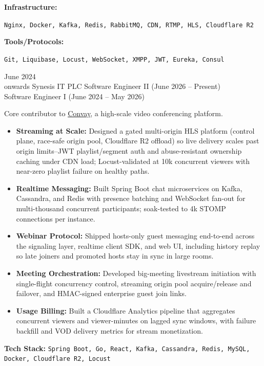 \documentclass[9pt]{developercv}
\begin{document}
\begin{minipage}[t]{0.2\textwidth}
    \textbf{Infrastructure:}
\end{minipage}
\hfill
\begin{minipage}[t]{0.8\textwidth}
  {\large \texttt{Nginx, Docker, Kafka, Redis, RabbitMQ, CDN, RTMP, HLS, Cloudflare R2}}
\end{minipage}

\begin{minipage}[t]{0.2\textwidth}
    \textbf{Tools/Protocols:}
\end{minipage}
\hfill
\begin{minipage}[t]{0.8\textwidth}
  {\large \texttt{Git, Liquibase, Locust, WebSocket, XMPP, JWT, Eureka, Consul}}
\end{minipage}

\begin{entrylist}
    \entry
        {June 2024 \\ onwards}
        {Synesis IT PLC}
        {Software Engineer II \textnormal{\small (June 2026 -- Present)} \\ Software Engineer I \textnormal{\small (June 2024 -- May 2026)}}
        {Core contributor to \href{https://convay.com}{Convay}, a high-scale video conferencing platform.
        \begin{itemize}\setlength\itemsep{0.05em}
            \item \textbf{Streaming at Scale:} Designed a gated multi-origin HLS platform (control plane, race-safe origin pool, Cloudflare R2 offload) so live delivery scales past origin limits--JWT playlist/segment auth and abuse-resistant ownership caching under CDN load; Locust-validated at 10k concurrent viewers with near-zero playlist failure on healthy paths.
            \item \textbf{Realtime Messaging:} Built Spring Boot chat microservices on Kafka, Cassandra, and Redis with presence batching and WebSocket fan-out for multi-thousand concurrent participants; soak-tested to 4k STOMP connections per instance.
            \item \textbf{Webinar Protocol:} Shipped hosts-only guest messaging end-to-end across the signaling layer, realtime client SDK, and web UI, including history replay so late joiners and promoted hosts stay in sync in large rooms.
            \item \textbf{Meeting Orchestration:} Developed big-meeting livestream initiation with single-flight concurrency control, streaming origin pool acquire/release and failover, and HMAC-signed enterprise guest join links.
            \item \textbf{Usage Billing:} Built a Cloudflare Analytics pipeline that aggregates concurrent viewers and viewer-minutes on lagged sync windows, with failure backfill and VOD delivery metrics for stream monetization.
        \end{itemize}
        \vspace{2pt}\noindent\textbf{Tech Stack:} \texttt{Spring Boot, Go, React, Kafka, Cassandra, Redis, MySQL, Docker, Cloudflare R2, Locust}
        }
\end{entrylist}
\end{document}
